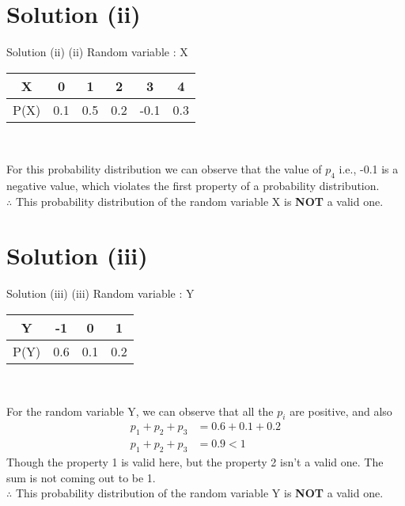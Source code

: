 \documentclass{beamer}
\begin{document}
\section{Solution (ii)}
\begin{frame}{Solution (ii)}
(ii) Random variable : X
\begin{table}
\centering
\begin{tabular}{|c|c|c|c|c|c|}
\hline
    X & 0 & 1 & 2 & 3 & 4 \\ 
\hline
    P(X) & 0.1 & 0.5 & 0.2 & -0.1 & 0.3\\ 
\hline
\end{tabular}\\
\end{table}
\par For this probability distribution we can observe that the value of $p_4$ i.e., -0.1 is a negative value, which violates the first property of a probability distribution.\\
	      $\therefore$ This probability distribution of the random variable X is \textbf{NOT} a valid one.
\end{frame}
\section{Solution (iii)}
\begin{frame}{Solution (iii)}
(iii) Random variable : Y
\begin{table}
\centering
\begin{tabular}{|c|c|c|c|}
\hline
    Y & -1 & 0 & 1 \\ 
\hline
    P(Y) & 0.6 & 0.1 & 0.2\\ 
\hline
\end{tabular}\\
\end{table}
\par For the random variable Y, we can observe that all the $p_i$ are positive, and also
	      \begin{align}
	      p_1 + p_2 + p_3 &= 0.6 + 0.1 + 0.2\\
	       p_1 + p_2 + p_3 &= 0.9 < 1
	      \end{align}
	      Though the property 1 is valid here, but the property 2 isn't a valid one. The sum is not coming out to be 1.\\
	      $\therefore$ This probability distribution of the random variable Y is \textbf{NOT} a valid one.
\end{frame}
\end{document}
